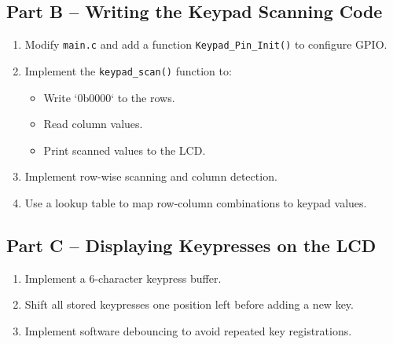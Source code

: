 \documentclass[12pt]{article}
\begin{document}
\subsection{Part B – Writing the Keypad Scanning Code}
\begin{enumerate}
    \item Modify \texttt{main.c} and add a function \texttt{Keypad\_Pin\_Init()} to configure GPIO.
    \item Implement the \texttt{keypad\_scan()} function to:
    \begin{itemize}
        \item Write `0b0000` to the rows.
        \item Read column values.
        \item Print scanned values to the LCD.
    \end{itemize}
    \item Implement row-wise scanning and column detection.
    \item Use a lookup table to map row-column combinations to keypad values.
\end{enumerate}

\subsection{Part C – Displaying Keypresses on the LCD}
\begin{enumerate}
    \item Implement a 6-character keypress buffer.
    \item Shift all stored keypresses one position left before adding a new key.
    \item Implement software debouncing to avoid repeated key registrations.
\end{enumerate}
\end{document}
